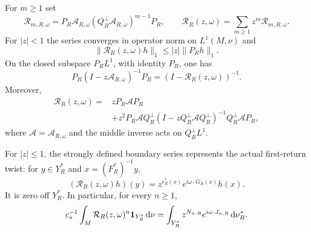 \begin{theorem}
\label{thm:common-renewal}
For $m\ge1$ set
\begin{equation}\label{eq:first-return-operator}
 \mathcal R_{m,R,\omega}
 =P_R\mathcal A_{R,\omega}
       (Q_R^\perp\mathcal A_{R,\omega})^{m-1}P_R,
 \qquad
 \mathcal R_R(z,\omega)=\sum_{m\ge1}z^m\mathcal R_{m,R,\omega}.
\end{equation}
For $|z|<1$ the series converges in operator norm on $L^1(M,\nu)$ and
\begin{equation}\label{eq:induced-damped-bound}
 \|\mathcal R_R(z,\omega)h\|_1\le |z|\|P_Rh\|_1.
\end{equation}
On the closed subspace $P_RL^1$, with identity $P_R$, one has
\begin{equation}\label{eq:physical-renewal-identity}
 P_R(I-z\mathcal A_{R,\omega})^{-1}P_R
       =(I-\mathcal R_R(z,\omega))^{-1}.
\end{equation}
Moreover,
\begin{equation}\label{eq:schur-return-operator}
 \begin{split}
 \mathcal R_R(z,\omega)={}&zP_R\mathcal A P_R\\
 &+z^2P_R\mathcal A Q_R^\perp
 (I-zQ_R^\perp\mathcal A Q_R^\perp)^{-1}
             Q_R^\perp\mathcal A P_R,
 \end{split}
\end{equation}
where $\mathcal A=\mathcal A_{R,\omega}$ and the middle inverse acts
on $Q_R^\perp L^1$.

For $|z|\le1$, the strongly defined boundary series represents the
actual first-return twist: for $y\in Y_R^*$ and $x=(F_R^*)^{-1}y$,
\begin{equation}\label{eq:actual-induced-realization}
 (\mathcal R_R(z,\omega)h)(y)
       =z^{r_R^*(x)}e^{i\omega\cdot G_R(x)}h(x).
\end{equation}
It is zero off $Y_R^*$. In particular, for every $n\ge1$,
\begin{equation}\label{eq:actual-record-pairing}
 c_*^{-1}\int_M\mathcal R_R(z,\omega)^n\mathbf1_{Y_R^*}\,\mathrm d\nu
       =\int_{Y_R^*}z^{N_{n,R}}e^{i\omega\cdot J_{n,R}}\,\mathrm d\nu_R^*.
\end{equation}
\end{theorem}
